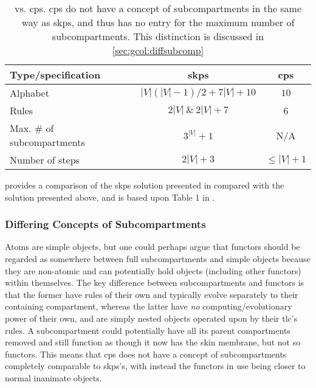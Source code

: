 \begin{table}
\centering
\begin{tabular}{@{}lcc@{}}
\toprule
Type/specification                & \gls{skps}        & \gls{cps} \\ \midrule
Alphabet                          & \(|V|(|V|-1)/2 + 7|V| + 10\) & \(10\)         \\
Rules                             & \(2|V|~\&~2|V| + 7\)       & 6          \\
Max. \# of subcompartments & \(3^|V| + 1\)             & N/A          \\
Number of steps                   & \(2|V| + 3\)             & \(\leq |V| + 1\)         \\ \bottomrule
\end{tabular}%
\caption{ vs. \gls{cps}.  \gls{cps} do not have a concept of subcompartments in the same way as \gls{skps}, and thus has no entry for the maximum number of subcompartments.  This distinction is discussed in \cref{sec:gcol:diffsubcomp}}
\label{tab:gcol:skpcomp}
\end{table}


 provides a comparison of the \gls{skps} solution presented in \cite{Gheorghe2013} compared with the solution presented above, and is based upon Table 1 in \cite{Gheorghe2013}.  

\subsubsection{\label{sec:gcol:diffsubcomp}Differing Concepts of Subcompartments}
Atoms are simple objects, but one could perhaps argue that functors should be regarded as somewhere between full subcompartments and simple objects because they are non-atomic and can potentially hold objects (including other functors) within themselves.  The key difference between subcompartments and functors is that the former have rules of their own and typically evolve separately to their containing compartment, whereas the latter have \emph{no} computing/evolutionary power of their own, and are simply nested objects operated upon by their \gls{tlc}'s rules.  A subcompartment could potentially have all its parent compartments removed and still function as though it now has the skin membrane, but not so functors.  This means that \gls{cps} does not have a concept of subcompartments completely comparable to \gls{skps}'s, with instead the functors in use being closer to normal inanimate objects.

